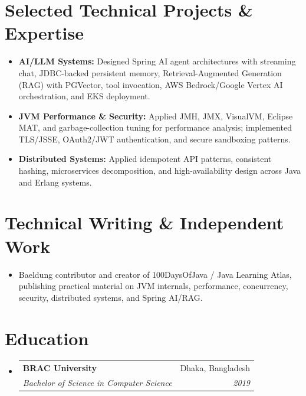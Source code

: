\documentclass[letterpaper,11pt]{article}
\makeatletter
\newcommand{\resumeItem}[1]{
  \item\small{#1 \vspace{-2pt}}
}
\newcommand{\resumeSubheading}[4]{
  \vspace{-2pt}\item
    \begin{tabular*}{0.97\textwidth}[t]{l@{\extracolsep{\fill}}r}
      \textbf{#1} & #2 \\
      \textit{\small#3} & \textit{\small #4} \\
    \end{tabular*}\vspace{-6pt}
}
\newcommand{\resumeSubHeadingListStart}{\begin{itemize}[leftmargin=*]}
\newcommand{\resumeSubHeadingListEnd}{\end{itemize}}
\makeatother
\begin{document}
\section{Selected Technical Projects \& Expertise}
\resumeSubHeadingListStart
\resumeItem{\textbf{AI/LLM Systems:} Designed Spring AI agent architectures with streaming chat, JDBC-backed persistent memory, Retrieval-Augmented Generation (RAG) with PGVector, tool invocation, AWS Bedrock/Google Vertex AI orchestration, and EKS deployment.}
\resumeItem{\textbf{JVM Performance \& Security:} Applied JMH, JMX, VisualVM, Eclipse MAT, and garbage-collection tuning for performance analysis; implemented TLS/JSSE, OAuth2/JWT authentication, and secure sandboxing patterns.}
\resumeItem{\textbf{Distributed Systems:} Applied idempotent API patterns, consistent hashing, microservices decomposition, and high-availability design across Java and Erlang systems.}
\resumeSubHeadingListEnd

\section{Technical Writing \& Independent Work}
\resumeSubHeadingListStart
\resumeItem{Baeldung contributor and creator of 100DaysOfJava / Java Learning Atlas, publishing practical material on JVM internals, performance, concurrency, security, distributed systems, and Spring AI/RAG.}
\resumeSubHeadingListEnd

\section{Education}
\resumeSubHeadingListStart
\resumeSubheading
{BRAC University}{Dhaka, Bangladesh}
{Bachelor of Science in Computer Science}{2019}
\resumeSubHeadingListEnd
\end{document}
